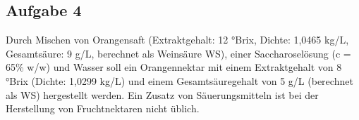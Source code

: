 \documentclass[a4paper,11pt]{article}
\newif\ifshowme
\begin{document}
\ifshowme
\antwort{
\begin{align*}
J &= P \cdot A \cdot \frac{\Delta p}{l}
\end{align*}

\pp 
\textbf{Sauerstoff:}
\begin{align*}
J &= P \cdot A \cdot \frac{\Delta p}{l} \\
 &= \frac{6,28 \cdot 10^{-6}~\text{m}^3 \cdot 10^{-4} ~\text{m}}{~\text{m}^2 \cdot ~\text{d} \cdot ~\text{bar}} \cdot \pi  \left( 1,25 \cdot 10^{-5}~\text{m} \right)^2  \cdot \frac{0,21 ~\text{bar}}{4 \cdot 10^{-5} ~\text{m}} \\
  &= 1,62 \cdot 10^{-13} ~\text{m}^3 / ~\text{d}
\end{align*}
\pp 
\textbf{Wasser:}
\begin{align*}
J &= P \cdot A \cdot \frac{\Delta p}{l} \\
 &= \frac{16,72 ~\text{g}  \cdot 10^{-4} ~\text{m}}{~\text{m}^2 \cdot ~\text{d} \cdot ~\text{bar}} \cdot \pi  \left( 1,25 \cdot 10^{-5}~\text{m} \right)^2  \cdot \frac{14,07 \cdot 10^{-3} ~\text{bar}}{4 \cdot 10^{-5} ~\text{m}} \\
  &= 2,88 \cdot 10^{-10} ~\text{g} / ~\text{d}
\end{align*}

}
\else
\fi



\subsection*{Aufgabe 4}
Durch Mischen von Orangensaft (Extraktgehalt: 12 °Brix, Dichte: 1,0465 kg/L, Gesamtsäure: 9
g/L, berechnet als Weinsäure WS), einer Saccharoselösung (c = 65\% w/w) und Wasser soll ein
Orangennektar mit einem Extraktgehalt von 8 °Brix (Dichte: 1,0299 kg/L) und einem
Gesamtsäuregehalt von 5 g/L (berechnet als WS) hergestellt werden. Ein Zusatz von
Säuerungsmitteln ist bei der Herstellung von Fruchtnektaren nicht üblich.
\end{document}
